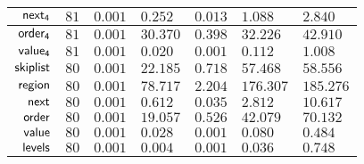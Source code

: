 {\begin{tabular}{|r||T||W|W|W||W|W||}
		$\mathsf{next_{4}}$			&  $81$ & $0.001$ &  $0.252$ & $0.013$ &  $1.088$ &  $2.840$ \\ \hline
		$\mathsf{order_{4}}$			&  $81$ & $0.001$ & $30.370$ & $0.398$ & $32.226$ & $42.910$ \\ \hline
		$\mathsf{value_{4}}$			&  $81$ & $0.001$ &  $0.020$ & $0.001$ &  $0.112$ &  $1.008$ \\ \hline \hline
		$\mathsf{skiplist}$			&  $80$ & $0.001$ & $22.185$ & $0.718$ & $57.468$ & $58.556$ \\ \hline
		$\mathsf{region}$			&  $80$ & $0.001$ & $78.717$ & $2.204$ &$176.307$ &$185.276$ \\ \hline
		$\mathsf{next}$				&  $80$ & $0.001$ &  $0.612$ & $0.035$ &  $2.812$ & $10.617$ \\ \hline
		$\mathsf{order}$				&  $80$ & $0.001$ & $19.057$ & $0.526$ & $42.079$ & $70.132$ \\ \hline
		$\mathsf{value}$				&  $80$ & $0.001$ &  $0.028$ & $0.001$ &  $0.080$ &  $0.484$ \\ \hline
		$\mathsf{levels}$			&  $80$ & $0.001$ &  $0.004$ & $0.001$ &  $0.036$ &  $0.748$ \\ \hline
	\end{tabular}
}
